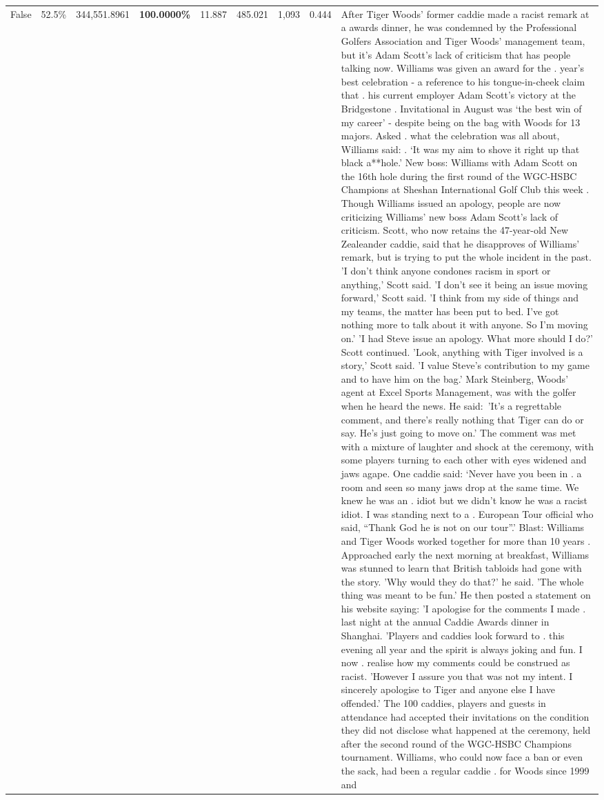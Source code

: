 \begin{table}[H]
\begin{tabular}{lllrlllll}
False & 52.5\% & 344,551.8961 & \bfseries \color{red} 100.0000\% & 11.887 & 485.021 & 1,093 & 0.444 & After Tiger Woods' former caddie made a racist remark at a awards dinner, he was condemned by the Professional Golfers Association and Tiger Woods' management team, but it's Adam Scott's lack of criticism that has people talking now. Williams was given an award for the . year’s best celebration - a reference to his tongue-in-cheek claim that . his current employer Adam Scott’s victory at the Bridgestone . Invitational in August was ‘the best win of my career’ - despite being on the bag with Woods for 13 majors. Asked . what the celebration was all about, Williams said: . ‘It was my aim to shove it right up that black a**hole.’ New boss: Williams with Adam Scott  on the 16th hole during the first round of the WGC-HSBC Champions at Sheshan International Golf Club this week . Though Williams issued an apology, people are now criticizing Williams' new boss Adam Scott's lack of criticism. Scott, who now retains the 47-year-old New Zealeander caddie, said that he disapproves of Williams' remark, but is trying to put the whole incident in the past. 'I don't think anyone condones racism in sport or anything,' Scott said. 'I don't see it being an issue moving forward,' Scott said. 'I think from my side of things and my teams, the matter has been put to bed. I've got nothing more to talk about it with anyone. So I'm moving on.' 'I had Steve issue an apology. What more should I do?' Scott continued. 'Look, anything with Tiger involved is a story,' Scott said. 'I value Steve's contribution to my game and to have him on the bag.' Mark Steinberg, Woods' agent at Excel Sports Management, was with the golfer when he heard the news. He said: 'It's a regrettable comment, and there's really nothing that Tiger can do or say. He's just going to move on.' The comment was met with a mixture of laughter and shock at the ceremony, with some players turning to each other with eyes widened and jaws agape. One caddie said: ‘Never have you been in . a room and seen so many jaws drop at the same time. We knew he was an . idiot but we didn’t know he was a racist idiot. I was standing next to a . European Tour official who said, “Thank God he is not on our tour”.’ Blast: Williams and Tiger Woods worked together for more than 10 years . Approached early the next morning at breakfast, Williams was stunned to learn that British tabloids had gone with the story. 'Why would they do that?' he said. 'The whole thing was meant to be fun.' He then posted a statement on his website saying: 'I apologise for the comments I made . last night at the annual Caddie Awards dinner in Shanghai. 'Players and caddies look forward to . this evening all year and the spirit is always joking and fun. I now . realise how my comments could be construed as racist. 'However I assure you that was not my intent. I sincerely apologise to Tiger and anyone else I have offended.' The 100 caddies, players and guests in attendance had accepted their invitations on the condition they did not disclose what happened at the ceremony, held after the second round of the WGC-HSBC Champions tournament. Williams, who could now face a ban or even the sack, had been a regular caddie . for Woods since 1999 and 
\end{tabular}
\end{table}
